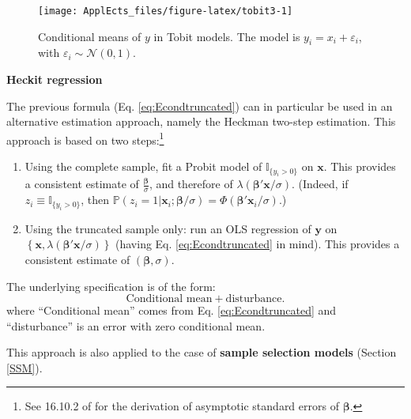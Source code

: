 \documentclass[
  12pt,
]{book}
\theoremstyle{definition}
\theoremstyle{definition}
\theoremstyle{definition}
\theoremstyle{definition}
\theoremstyle{remark}
\begin{document}
\begin{figure}
\texttt{[image: ApplEcts\_files/figure-latex/tobit3-1]} \caption{Conditional means of $y$ in Tobit models. The model is $y_i = x_i + \varepsilon_i$, with $\varepsilon_i \sim \mathcal{N}(0,1)$.}\label{fig:tobit3}
\end{figure}

\textbf{Heckit regression}

The previous formula (Eq. \eqref{eq:Econdtruncated}) can in particular be used in an alternative estimation approach, namely the Heckman two-step estimation. This approach is based on two steps:\footnote{See 16.10.2 of \citet{Cameron_Trivedi_2005} for the derivation of asymptotic standard errors of \(\boldsymbol\beta\).}

\begin{enumerate}
\def\labelenumi{\arabic{enumi}.}
\item
  Using the complete sample, fit a Probit model of \(\mathbb{I}_{\{y_i>0\}}\) on \(\mathbf{x}\). This provides a consistent estimate of \(\frac{\boldsymbol\beta}{\sigma}\), and therefore of \(\lambda(\boldsymbol\beta'\mathbf{x}/\sigma)\). (Indeed, if \(z_i \equiv \mathbb{I}_{\{y_i>0\}}\), then \(\mathbb{P}(z_i=1|\mathbf{x}_i;\boldsymbol\beta/\sigma)=\Phi(\boldsymbol\beta'\mathbf{x}_i/\sigma)\).)
\item
  Using the truncated sample only: run an OLS regression of \(\mathbf{y}\) on \(\left\{\mathbf{x},\lambda(\boldsymbol\beta'\mathbf{x}/\sigma)\right\}\) (having Eq. \eqref{eq:Econdtruncated} in mind). This provides a consistent estimate of \((\boldsymbol\beta,\sigma)\).
\end{enumerate}

The underlying specification is of the form:
\[
\mbox{Conditional mean} + \mbox{disturbance}.
\]
where ``Conditional mean'' comes from Eq. \eqref{eq:Econdtruncated} and ``disturbance'' is an error with zero conditional mean.

This approach is also applied to the case of \textbf{sample selection models} (Section \ref{SSM}).
\end{document}
